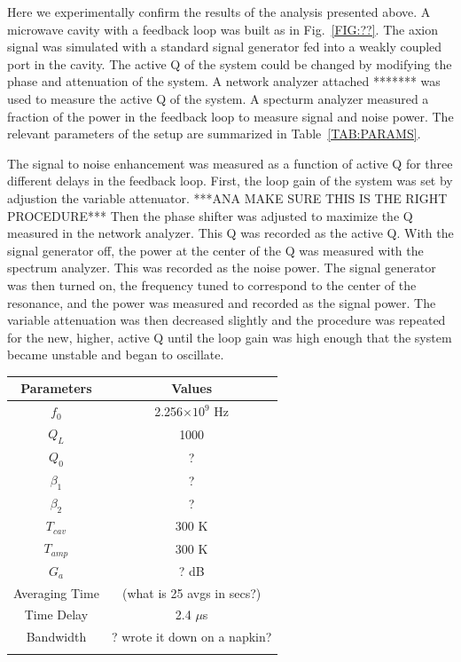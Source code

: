 \documentclass[aps,prl,twocolumn,groupedaddress]{revtex4-1}
\begin{document}
Here we experimentally confirm the results of the analysis presented above.
A microwave cavity with a feedback loop was built as in Fig.~\ref{FIG:??}.
The axion signal was simulated with a standard signal generator fed into a weakly coupled port in the cavity.
The active Q of the system could be changed by modifying the phase and attenuation of the system.
A network analyzer attached ******* was used to measure the active Q of the system.
A specturm analyzer measured a fraction of the power in the feedback loop to measure signal and noise power. 
The relevant parameters of the setup are summarized in Table~\ref{TAB:PARAMS}.

The signal to noise enhancement was measured as a function of active Q for three different delays in the feedback loop.
First, the loop gain of the system was set by adjustion the variable attenuator.  
***ANA MAKE SURE THIS IS THE RIGHT PROCEDURE***
Then the phase shifter was adjusted to maximize the Q measured in the network analyzer.
This Q was recorded as the active Q.
With the signal generator off, the power at the center of the Q was measured with the spectrum analyzer.
This was recorded as the noise power.
The signal generator was then turned on, the frequency tuned to correspond to the center of the resonance, and the power was measured and recorded as the signal power. 
The variable attenuation was then decreased slightly and the procedure was repeated for the new, higher, active Q until the loop gain was high enough that the system became unstable and began to oscillate. 

\begin{tabular}{|c|c|}
\hline
Parameters & Values \\ \hline
$f_0$ & 2.256$\times 10^9$ Hz \\
$Q_L$ & 1000 \\
$Q_0$ & ? \\
$\beta_1$ & ? \\
$\beta_2$ & ? \\
$T_{cav}$ & 300 K \\
$T_{amp}$ & 300 K \\
$G_a$ & ? dB \\
Averaging Time & (what is 25 avgs in secs?) \\
Time Delay & 2.4 $\mu$s \\
Bandwidth & ? wrote it down on a napkin? \\
\hline
\label{TAB:PARAMS}
\end{tabular}\\
\end{document}
